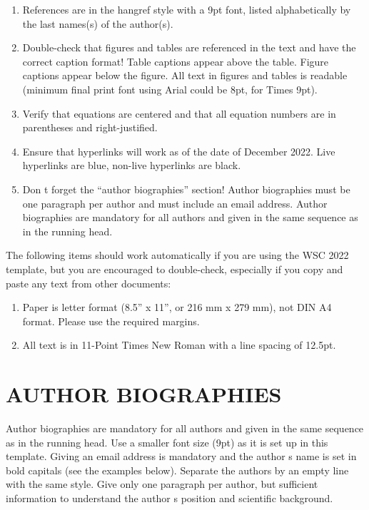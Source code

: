 \documentclass{article}
\begin{document}
\begin{enumerate}
\item References are in the hangref style with a 9pt font, listed alphabetically by the last names(s) of the author(s).
\item Double-check that figures and tables are referenced in the text and have the correct caption format! Table captions appear above the table. Figure captions appear below the figure. All text in figures and tables is readable (minimum final print font using Arial could be 8pt, for Times 9pt).
\item Verify that equations are centered and that all equation numbers are in parentheses and right-justified.
\item Ensure that hyperlinks will work as of the date of December 2022. Live hyperlinks are blue, non-live hyperlinks are black.
\item	Don t forget the ``author biographies'' section! Author biographies must be one paragraph per author and must include an email address. Author biographies are mandatory for all authors and given in the same sequence as in the running head. 
\end{enumerate}

The following items should work automatically if you are using the WSC 2022 template, but you are encouraged to double-check, especially if you copy and paste any text from other documents:

\begin{enumerate}
\item Paper is letter format (8.5'' x 11'', or 216 mm x 279 mm), not DIN A4 format. Please use the required margins. 
\item All text is in 11-Point Times New Roman with a line spacing of 12.5pt.
\end{enumerate}

\footnotesize






\section*{AUTHOR BIOGRAPHIES}

{\normalsize Author biographies are mandatory for all authors and given in the same sequence as in the running head. Use a smaller font size (9pt) as it is set up in this template. Giving an email address is mandatory and the author s name is set in bold capitals (see the examples below). Separate the authors by an empty line with the same style. Give only one paragraph per author, but sufficient information to understand the author s position and scientific background.}\\
\end{document}
